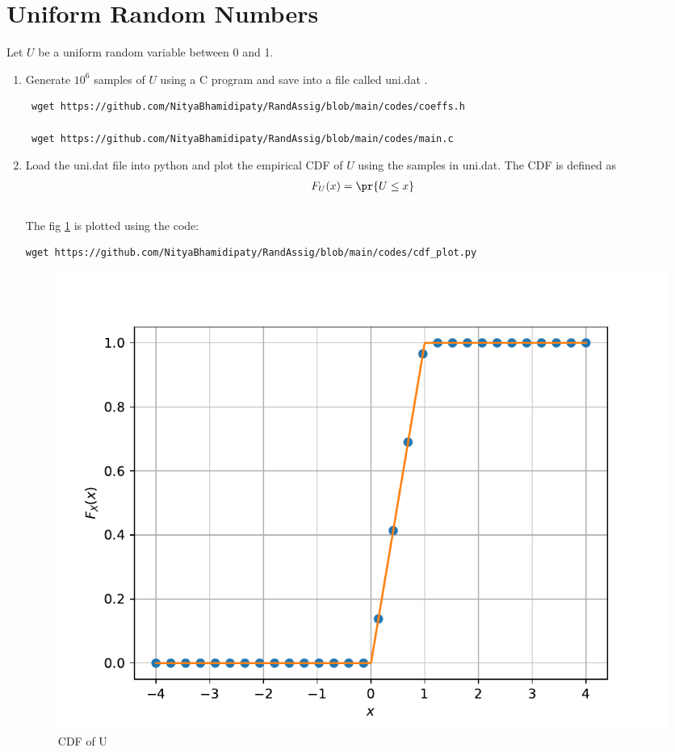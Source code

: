 \documentclass[journal,12pt,twocolumn]{IEEEtran}
\renewcommand\thesection{\arabic{section}}
\begin{document}
\section{Uniform Random Numbers}
Let $U$ be a uniform random variable between 0 and 1.
\begin{enumerate}[label=\thesection.\arabic*
,ref=\thesection.\theenumi]
\item Generate $10^6$ samples of $U$ using a C program and save into a file called uni.dat .
\\
\solution
\begin{lstlisting}
 wget https://github.com/NityaBhamidipaty/RandAssig/blob/main/codes/coeffs.h
  
 wget https://github.com/NityaBhamidipaty/RandAssig/blob/main/codes/main.c
\end{lstlisting}
\item
Load the uni.dat file into python and plot the empirical CDF of $U$ using the samples in uni.dat. The CDF is defined as
\begin{align}
F_{U}(x) = \pr{U \le x}
\end{align}
\\
\solution
The fig \ref{fig:uni_cdf} is plotted using the code:
\begin{lstlisting}
wget https://github.com/NityaBhamidipaty/RandAssig/blob/main/codes/cdf_plot.py
\end{lstlisting}
\begin{figure}[h]
    \centering
    \includegraphics[width=\columnwidth]{figs/uni_cdf.pdf}
    \caption{CDF of U}
    \label{fig:uni_cdf}
\end{figure}

\end{enumerate}
\end{document}
